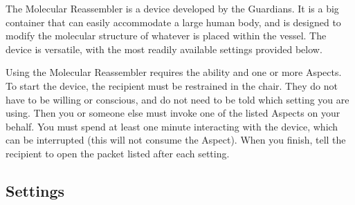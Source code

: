 \documentclass[green]{guardians}
\begin{document}
\name{\gReassembler{}}

The Molecular Reassembler is a device developed by the Guardians. It is a big container that can easily accommodate a large human body, and is designed to modify the molecular structure of whatever is placed within the vessel. The device is versatile, with the most readily available settings provided below.

Using the Molecular Reassembler requires the \aGuardianTech{} ability and one or more Aspects. To start the device, the recipient must be restrained in the chair. They do not have to be willing or conscious, and do not need to be told which setting you are using. Then you or someone else must invoke one of the listed Aspects on your behalf. You must spend at least one minute interacting with the device, which can be interrupted (this will not consume the Aspect). When you finish, tell the recipient to open the packet listed after each setting.


\subsection{Settings}
\end{document}
